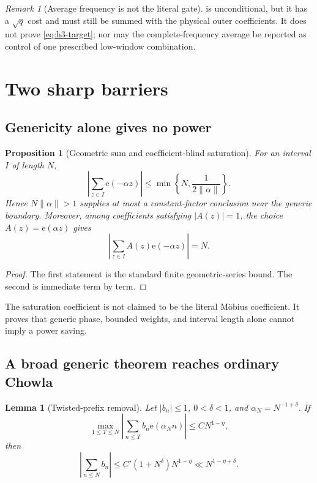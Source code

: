 \documentclass[11pt]{article}
\newtheorem{proposition}[theorem]{Proposition}
\newtheorem{lemma}[theorem]{Lemma}
\theoremstyle{definition}
\theoremstyle{remark}
\newtheorem{remark}[theorem]{Remark}
\newcommand{\e}{\mathrm e}
\begin{document}
\begin{remark}[Average frequency is not the literal gate]
 is unconditional, but it has a
\(\sqrt q\) cost and must still be summed with the physical outer
coefficients.  It does not prove \eqref{eq:h3-target}; nor may the
complete-frequency average be reported as control of one prescribed
low-window combination.
\end{remark}

\section{Two sharp barriers}

\subsection{Genericity alone gives no power}

\begin{proposition}[Geometric sum and coefficient-blind saturation]
\label{prop:generic-saturation}
For an interval \(I\) of length \(N\),
\[
 \left|\sum_{z\in I}\e(-\alpha z)\right|
 \le
 \min\left\{N,\frac1{2\|\alpha\|}\right\}.
\]
Hence \(N\|\alpha\|>1\) supplies at most a constant-factor conclusion
near the generic boundary.  Moreover, among coefficients satisfying
\(|A(z)|=1\), the choice \(A(z)=\e(\alpha z)\) gives
\[
 \left|\sum_{z\in I}A(z)\e(-\alpha z)\right|=N.
\]
\end{proposition}

\begin{proof}
The first statement is the standard finite geometric-series bound.
The second is immediate term by term.
\end{proof}

The saturation coefficient is not claimed to be the literal
M\"obius coefficient.  It proves that generic phase, bounded
weights, and interval length alone cannot imply a power saving.

\subsection{A broad generic theorem reaches ordinary Chowla}

\begin{lemma}[Twisted-prefix removal]
\label{lem:twist-removal}
Let \(|b_n|\le1\), \(0<\delta<1\), and
\(\alpha_N=N^{-1+\delta}\).  If
\[
 \max_{1\le T\le N}
 \left|\sum_{n\le T}b_n\e(\alpha_Nn)\right|
 \le C N^{1-\eta},
\]
then
\begin{equation}
 \left|\sum_{n\le N}b_n\right|
 \le C'(1+N^\delta)N^{1-\eta}
 \ll N^{1-\eta+\delta}.
\label{eq:abel-transfer}
\end{equation}
\end{lemma}
\end{document}
